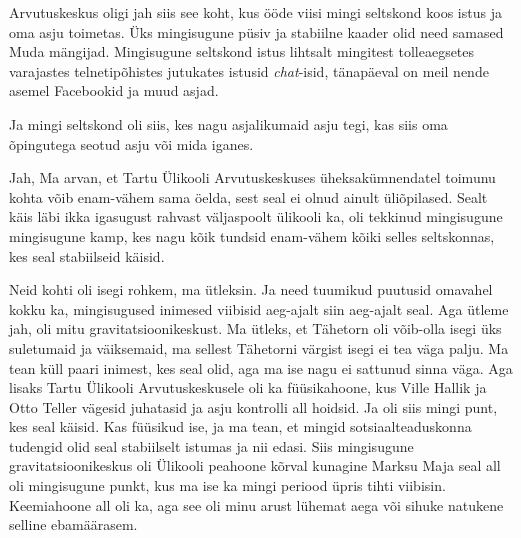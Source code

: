 
Arvutuskeskus oligi jah siis see koht, kus ööde viisi mingi seltskond koos istus ja oma asju toimetas. Üks mingisugune püsiv ja stabiilne kaader olid need samased Muda mängijad. Mingisugune seltskond istus  lihtsalt mingitest tolleaegsetes varajastes telnetipõhistes jutukates istusid \emph{chat}-isid, tänapäeval on meil nende asemel Facebookid ja muud asjad. 

Ja mingi seltskond oli siis, kes nagu asjalikumaid asju tegi, kas siis oma  õpingutega seotud asju või mida iganes. 


Jah, Ma arvan, et Tartu Ülikooli Arvutuskeskuses üheksakümnendatel toimunu kohta võib enam-vähem sama öelda, sest seal ei olnud ainult üliõpilased. Sealt käis läbi ikka igasugust rahvast väljaspoolt ülikooli ka,  oli tekkinud mingisugune mingisugune kamp, kes nagu kõik tundsid enam-vähem kõiki selles seltskonnas, kes seal stabiilseid käisid. 


Neid kohti oli isegi rohkem, ma ütleksin. Ja need tuumikud  puutusid omavahel kokku ka, mingisugused inimesed viibisid aeg-ajalt siin aeg-ajalt seal. Aga ütleme jah, oli mitu gravitatsioonikeskust. Ma ütleks, et Tähetorn oli võib-olla  isegi üks  suletumaid ja väiksemaid, ma sellest Tähetorni värgist isegi ei tea väga palju. Ma tean küll paari inimest, kes seal olid, aga ma ise nagu ei sattunud sinna väga. Aga lisaks  Tartu Ülikooli Arvutuskeskusele oli ka füüsikahoone, kus Ville Hallik ja Otto Teller vägesid juhatasid ja  asju kontrolli all hoidsid. Ja oli siis mingi punt, kes seal käisid. Kas füüsikud ise, ja ma tean, et mingid sotsiaalteaduskonna tudengid olid seal stabiilselt istumas ja nii edasi. Siis  mingisugune gravitatsioonikeskus oli Ülikooli peahoone kõrval kunagine Marksu Maja seal all oli mingisugune punkt, kus ma ise ka mingi periood üpris tihti viibisin. Keemiahoone all oli ka, aga see oli minu arust  lühemat aega või sihuke natukene selline ebamäärasem. 

